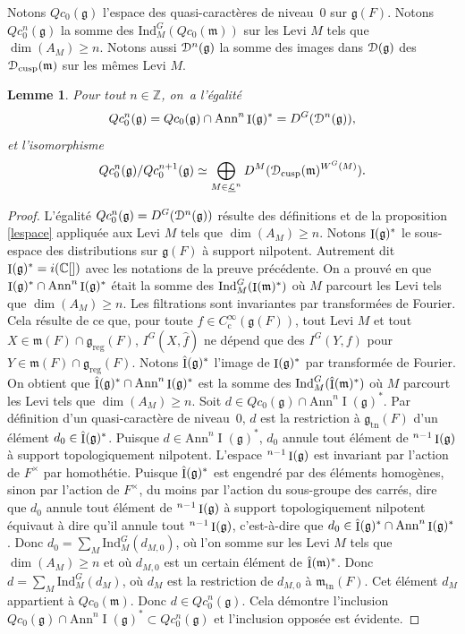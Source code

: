 \documentclass[11pt]{article}
\numberwithin{equation}{section}\providecommand{\og}{«\,}\providecommand{\fg}{\,»}
\let\mathcal \EuScript
\newcommand{\NoChangel}[1]{%
\expandafter\let\csname old\string#1\endcsname=#1
\let#1=\relax
\newcommand{#1}{\mathcode`l="716C\csname old\string#1\endcsname\mathcode`l="7160 }%
}
\newcommand{\frg}{\mathfrak{g}}
\newcommand{\mfrm}{\mathfrak{m}}
\newcommand{\Ann}{\mathrm{Ann}}
\newcommand{\rc}{\mathrm{c}}
\newcommand{\cusp}{\mathrm{cusp}}
\newcommand{\Fil}{\mathrm{Fil}} \NoChangel{\Fil}
\newcommand{\Ind}{\mathrm{Ind}}
\newcommand{\nil}{\mathrm{nil}} \NoChangel{\nil}
\newcommand{\Nil}{\mathrm{Nil}} \NoChangel{\Nil}
\newcommand{\reg}{\mathrm{reg}}
\newcommand{\tn}{\mathrm{tn}}
\DeclareMathOperator{\rI}{I}
\newcommand{\cD}{\mathcal{D}}
\newcommand{\cL}{\mathcal{L}}
\newcommand{\CC}{\mathbb{C}}
\newcommand{\ZZ}{\mathbb{Z}}
\theoremstyle{plain}
\newtheorem*{lem*}{Lemme}
\theoremstyle{definition}
\begin{document}
Notons $Qc_{0}(\frg)$ l'espace des quasi-caractères de niveau~$0$ sur $\frg(F)$. Notons $Qc_{0}^n(\frg)$ la somme des $\Ind_{M}^G(Qc_{0}(\mfrm))$ sur les Levi $M$ tels que $\dim(A_{M})\geq n$. Notons aussi $\cD^n(\frg)$ la somme des images dans $\cD(\frg)$ des $\cD_{\cusp}(\mfrm)$ sur les mêmes Levi $M$.

\begin{lem*}
Pour tout $n\in \ZZ$, on~a l'égalité
\[
Qc_{0}^n(\frg)=Qc_{0}(\frg)\cap \Ann^n\rI(\frg)^*=D^G(\cD^n(\frg)),
\]
et l'isomorphisme
\[
Qc_{0}^n(\frg)/Qc_{0}^{n+1}(\frg)\simeq \bigoplus_{M\in \underline{\cL}^n}D^M(\cD_{\cusp}(\mfrm)^{W^G(M)}).
\]
\end{lem*}

\begin{proof}
L'égalité $Qc_{0}^n(\frg)=D^G(\cD^n(\frg))$ résulte des définitions et de la proposition \ref{lespace} appliquée aux Levi $M$ tels que $\dim(A_{M})\geq n$. Notons $\rI(\frg)^*_{\nil}$ le sous-espace des distributions sur $\frg(F)$ à support nilpotent. Autrement dit $\rI(\frg)^*_{\nil}=i(\CC[\Nil])$ avec les notations de la preuve précédente. On a prouvé en \cite[Prop.\,I.5.3]{MW} que $\rI(\frg)^*_{\nil}\cap \Ann^n\rI(\frg)^*$ était la somme des $\Ind_{M}^G(\rI(\mfrm)^*_{\nil})$ où $M$ parcourt les Levi tels que $\dim(A_{M})\geq n$. Les filtrations sont invariantes par transformées de Fourier. Cela résulte de ce que, pour toute $f\in C_{\rc}^{\infty}(\frg(F))$, tout Levi $M$ et tout $X\in \mfrm(F)\cap \frg_{\reg}(F)$, $I^G(X,\hat{f})$ ne dépend que des $I^G(Y,f)$ pour $Y\in \mfrm(F)\cap \frg_{\reg}(F)$. Notons $\hat{\rI}(\frg)^*_{\nil}$ l'image de $\rI(\frg)^*_{\nil}$ par transformée de Fourier. On obtient que $\hat{\rI}(\frg)^*_{\nil}\cap \Ann^n\rI(\frg)^*$ est la somme des $\Ind_{M}^G(\hat{\rI}(\mfrm)^*_{\nil})$ où $M$ parcourt les Levi tels que $\dim(A_{M})\geq n$. Soit $d\in Qc_{0}(\frg)\cap \Ann^n\rI(\frg)^* $. Par définition d'un quasi-caractère de niveau~$0$, $d$ est la restriction à $\frg_{\tn}(F)$ d'un élément $d_{0}\in \hat{\rI}(\frg)^*_{\nil}$. Puisque $d\in \Ann^n\rI(\frg)^*$, $d_{0}$ annule tout élément de $\Fil^{n-1}\rI(\frg)$ à support topologiquement nilpotent. L'espace $\Fil^{n-1}\rI(\frg)$ est invariant par l'action de $F^{\times}$ par homothétie. Puisque $\hat{\rI}(\frg)^*_{\nil}$ est engendré par des éléments homogènes, sinon par l'action de $F^{\times}$, du moins par l'action du sous-groupe des carrés, dire que $d_{0}$ annule tout élément de $\Fil^{n-1}\rI(\frg)$ à support topologiquement nilpotent équivaut à dire qu'il annule tout $\Fil^{n-1}\rI(\frg)$, c'est-à-dire que $d_{0}\in \hat{\rI}(\frg)^*_{\nil}\cap \Ann^n\rI(\frg)^*$. Donc $d_{0}=\sum_{M}\Ind_{M}^G(d_{M,0})$, où l'on somme sur les Levi $M$ tels que $\dim(A_{M})\geq n$ et où $d_{M,0}$ est un certain élément de $\hat{\rI}(\mfrm)^*_{\nil}$. Donc $d= \sum_{M}\Ind_{M}^G(d_{M})$, où $d_{M}$ est la restriction de $d_{M,0}$ à $\mfrm_{\tn}(F)$. Cet élément $d_{M}$ appartient à $Qc_{0}(\mfrm)$. Donc $d\in Qc_{0}^n(\frg)$. Cela démontre l'inclusion $Qc_{0}(\frg)\cap \Ann^n\rI(\frg)^*\subset Qc_{0}^n(\frg)$ et l'inclusion opposée est évidente.


\end{proof}
\end{document}
